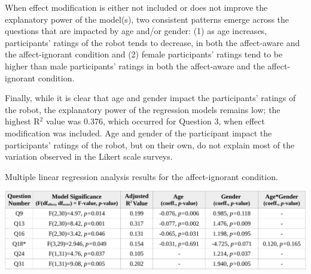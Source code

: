 \documentclass[12pt]{report}
\begin{document}
When effect modification is either not included or does not improve the
explanatory power of the model(s), two consistent patterns emerge across the
questions that are impacted by age and/or gender: (1) as age increases,
participants' ratings of the robot tends to decrease, in both the affect-aware
and the affect-ignorant condition and (2) female participants' ratings tend to
be higher than male participants' ratings in both the affect-aware and the
affect-ignorant condition.

Finally, while it is clear that age and gender impact the participants' ratings
of the robot, the explanatory power of the regression models remains low; the
highest R$^2$ value was 0.376, which occurred for Question 3, when effect
modification was included. Age and gender of the participant impact the
participants' ratings of the robot, but on their own, do not explain most of the
variation observed in the Likert scale surveys.

\begin{table}[t]
  \centering
  \caption{Multiple linear regression analysis results for the affect-ignorant
  condition.}
  \label{fig:demographics-results-emotion-ignorance}
  \vspace*{-3mm}
  \includegraphics[width=1\textwidth]{figure/demographics-results-emotion-ignorance-croped.pdf}
\end{table}
\end{document}
